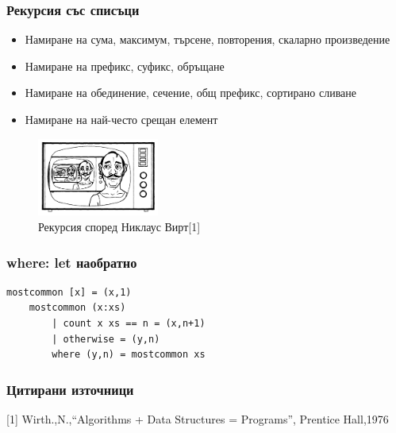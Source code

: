 \documentclass{beamer}
\begin{document}
\begin{frame}[fragile]
  \frametitle{Рекурсия със списъци}


  \begin{itemize}
    \item Намиране на сума, максимум, търсене, повторения, скаларно произведение
    \item Намиране на префикс, суфикс, обръщане
    \item Намиране на обединение, сечение, общ префикс, сортирано сливане
    \item Намиране на най-често срещан елемент
  \end{itemize}  

\begin{center}
  \begin{figure}
    \includegraphics[width=4.0cm]{images/rec_wirt}  
    \caption{Рекурсия според Никлаус Вирт[1]}
  \end{figure}
  
\end{center}
\end{frame}

\begin{frame}[fragile]
  \frametitle{where: let наобратно}
  \begin{lstlisting}[basicstyle=\small]
    mostcommon [x] = (x,1)
    mostcommon (x:xs) 
        | count x xs == n = (x,n+1)
        | otherwise = (y,n)
        where (y,n) = mostcommon xs    
  \end{lstlisting}
\end{frame}



\begin{frame}[fragile]
  \frametitle{Цитирани източници}

    [1] Wirth.,N.,``Algorithms + Data Structures = Programs'', Prentice Hall,1976
\end{frame}


\end{document}
